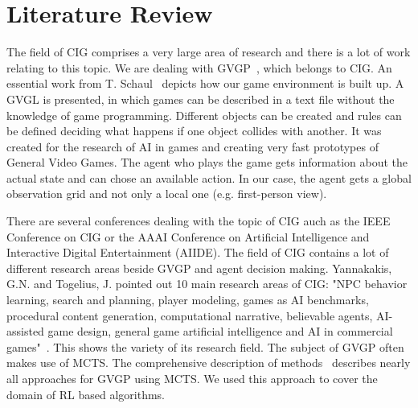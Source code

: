 \section{Literature Review} 
\label{sec:lit}

The field of \ac{CIG} comprises a very large area of research and there is a lot of work relating to this topic. We are dealing with \ac{GVGP}~\cite{BatesCongdon2013}, which belongs to \ac{CIG}. 
An essential work from T. Schaul~\cite{schaul2013pyvgdl} depicts how our game environment is built up. A \ac{GVGL} is presented, in which games can be described in a text file without the knowledge of game programming. Different objects can be created and rules can be defined deciding what happens if one object collides with another. It was created for the research of \ac{AI} in games and creating very fast prototypes of General Video Games. The agent who plays the game gets information about the actual state and can chose an available action. In our case, the agent gets a global observation grid and not only a local one (e.g. first-person view). 

There are several conferences dealing with the topic of \ac{CIG} auch as the IEEE Conference on \ac{CIG} or the AAAI Conference on Artificial Intelligence and Interactive Digital Entertainment (AIIDE). The field of \ac{CIG} contains a lot of different research areas beside \ac{GVGP} and agent decision making. Yannakakis, G.N. and Togelius, J. pointed out 10 main research areas of \ac{CIG}: "NPC behavior learning, search and planning, player modeling, games as AI benchmarks, procedural content generation, computational narrative, believable agents, AI-assisted game design, general game artificial intelligence and AI in commercial games"~\cite{panorama}.
This shows the variety of its research field. The subject of \ac{GVGP} often makes use of \ac{MCTS}. The comprehensive description of methods~\cite{BrowneMCTSurvey} describes nearly all approaches for \ac{GVGP} using \ac{MCTS}. We used this approach to cover the domain of \ac{RL} based algorithms.